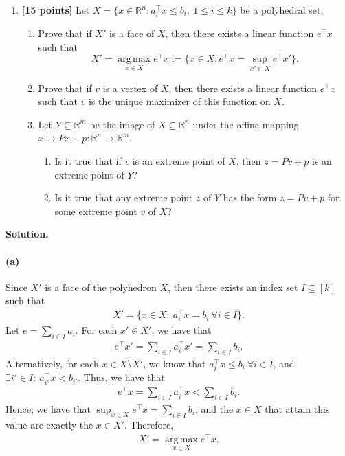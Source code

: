 \documentclass[11pt,letterpaper]{article}
\theoremstyle{definition}
\newcommand{\reals}{\mathbb{R}}
\newcommand{\solution}{\medskip\noindent\textbf{Solution.}\par\medskip}
\begin{document}
\begin{enumerate}[resume=q]
\item \textbf{[15 points]} Let $X = \{x \in \reals^n : a_i^\top x \leq b_i, \ 1 \leq i \leq k\}$ be a polyhedral set.
\begin{enumerate}
\item Prove that if $X'$ is a face of $X$, then there exists a linear function $e^\top x$ such that
\[
X' = \operatorname*{arg\,max}_{x \in X} e^\top x := \{x \in X : e^\top x = \sup_{x' \in X} e^\top x'\}.
\]
\item Prove that if $v$ is a vertex of $X$, then there exists a linear function $e^\top x$ such that $v$ is the unique maximizer of this function on $X$.
\item Let $Y \subseteq \reals^m$ be the image of $X \subseteq \reals^n$ under the affine mapping $x \mapsto Px + p : \reals^n \to \reals^m$.
\begin{enumerate}[label=(\roman*)]
\item Is it true that if $v$ is an extreme point of $X$, then $z = Pv + p$ is an extreme point of $Y$?
\item Is it true that any extreme point $z$ of $Y$ has the form $z = Pv + p$ for some extreme point $v$ of $X$?
\end{enumerate}
\end{enumerate}
\end{enumerate}

\solution

\paragraph{(a)}
Since $X'$ is a face of the polyhedron $X$, then there exists an index set $I\subseteq [k]$ such that 
\begin{align*}
    X' = \{x\in X:\ a^\top_i x= b_i \ \forall i\in I\}.
\end{align*}
Let $e = \sum_{i\in I} a_i$. For each $x'\in X'$, we have that 
\begin{align*}
    e^\top x' = \sum_{i\in I} a^\top_i x' = \sum_{i\in I}b_i.
\end{align*}
Alternatively, for each $x\in X\setminus X'$, we know that $a^\top_i x\le b_i\ \forall i\in I$, and $\exists i'\in I:\ a^\top_{i'} x< b_{i'}$.
Thus, we have that 
\begin{align*}
    e^\top x = \sum_{i\in I} a^\top_i x < \sum_{i\in I} b_i.
\end{align*}
Hence, we have that $\sup_{x\in X } e^\top x = \sum_{i\in I}b_i$, and the $x\in X$ that attain this value are exactly the $x\in X'$.
Therefore,
 \begin{align*}
    X' = \operatorname*{arg\,max}_{x \in X} e^\top x.
 \end{align*}
\end{document}
